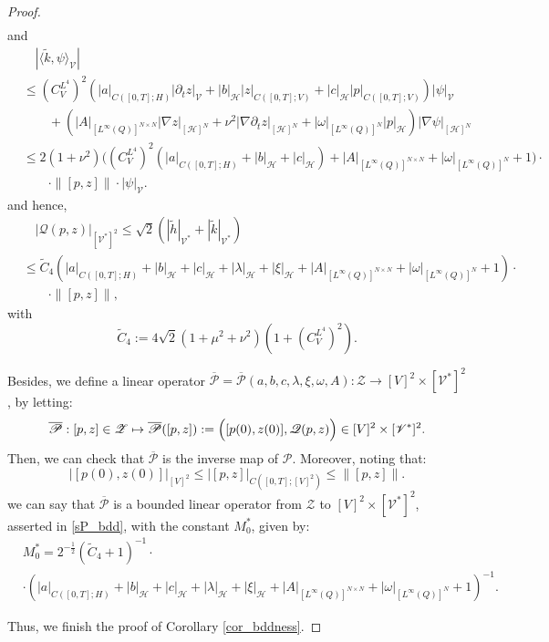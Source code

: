 \documentclass[10pt,a4paper]{amsart}
\def\sH{\mathscr{H}}
\def\sP{\mathscr{P}}
\def\sQ{\mathscr{Q}}
\def\sV{\mathscr{V}}
\def\sZ{\mathscr{Z}}
\begin{document}
\begin{proof}
\begin{align}
  \end{align}
  and
  \begin{align}
    &\quad|\langle \tilde k,\psi \rangle_\sV| 
    \\
    &\leq (C_V^{L^4})^2(|a|_{C([0,T];H)} |\partial_t z|_\sV + |b|_\sH |z|_{C([0,T];V)} + |c|_\sH |p|_{C([0,T];V)})|\psi|_\sV 
    \\
    &\qquad + (|A|_{[L^\infty(Q)]^{N \times N}} |\nabla z|_{[\sH]^N} + \nu^2 |\nabla \partial_t z|_{[\sH]^N} + |\omega|_{[L^\infty(Q)]^N} |p|_\sH) |\nabla \psi|_{[\sH]^N}
    \\
    &\leq 2 (1 + \nu^2) \bigl( (C_V^{L^4})^2 (|a|_{C([0,T];H)} + |b|_\sH + |c|_\sH) + |A|_{[L^\infty(Q)]^{N \times N}} + |\omega|_{[L^\infty(Q)]^N} + 1\bigr)\cdot 
    \\
    &\qquad \cdot \| [p,z] \| \cdot |\psi|_\sV.
  \end{align}
  and hence,
  \begin{align}
    &\quad |\sQ(p,z)|_{[\sV^*]^2} \leq \sqrt{2}(|\tilde h|_{\sV^*} + |\tilde k|_{\sV^*}) \label{P_bdd_1}
    \\
    &\leq \tilde C_4 (|a|_{C([0,T];H)} + |b|_\sH + |c|_\sH + |\lambda|_\sH + |\xi|_\sH + |A|_{[L^\infty(Q)]^{N \times N}} + |\omega|_{[L^\infty(Q)]^N} + 1) \cdot
    \\
    &\qquad \cdot \| [p,z] \|,
  \end{align}
  with
  \begin{equation}
    \tilde C_4 := 4\sqrt{2} (1 + \mu^2 + \nu^2)(1 + (C_V^{L^4})^2).
  \end{equation}

  Besides, we define a linear operator $\overline{\sP} = \overline{\sP}(a,b,c,\lambda,\xi,\omega,A): \sZ \longrightarrow [V]^2 \times [\sV^*]^2$, by letting:
  \begin{equation}
    \overline{\sP}: [p,z] \in \sZ \mapsto \overline{\sP}([p,z]) := \Bigl( [p(0), z(0)], \sQ(p,z) \Bigr) \in [V]^2 \times [\sV^*]^2.
  \end{equation}
  Then, we can check that $\overline{\sP}$ is the inverse map of $\sP$. Moreover, noting that:
  \begin{equation}
    |[p(0), z(0)]|_{[V]^2} \leq |[p,z]|_{C([0,T];[V]^2)} \leq \|[p,z]\|. \label{P_bdd_2}
  \end{equation}
  we can say that $\overline{\sP}$ is a bounded linear operator from $\sZ$ to $[V]^2 \times [\sV^*]^2$, asserted in \eqref{sP_bdd}, with the constant $M_0^*$, given by:
  \begin{align}
    &M_0^* = 2^{-\frac{1}{2}}(\tilde C_4 + 1)^{-1} \cdot
    \\
    &\cdot (|a|_{C([0,T];H)} + |b|_\sH + |c|_\sH + |\lambda|_\sH + |\xi|_\sH + |A|_{[L^\infty(Q)]^{N \times N}} + |\omega|_{[L^\infty(Q)]^N} + 1)^{-1}.
  \end{align}

  Thus, we finish the proof of Corollary \ref{cor_bddness}.

\end{proof}
\end{document}
